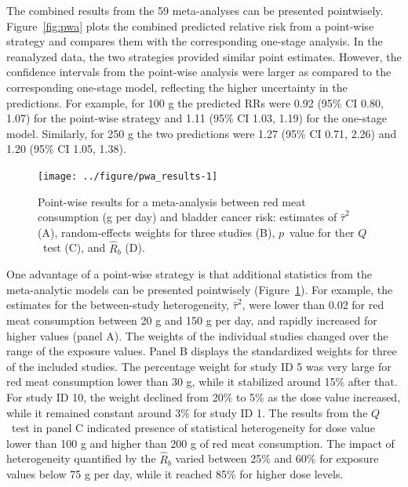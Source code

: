 \documentclass[11pt,a4paper,twoside,openany]{book}\usepackage{knitr}
\begin{document}
{{\begin{knitrout}
\end{knitrout}

\noindent The combined results from the 59 meta-analyses can be presented pointwisely. Figure~\ref{fig:pwa} plots the combined predicted relative risk from a point-wise strategy and compares them with the corresponding one-stage analysis. In the reanalyzed data, the two strategies provided similar point estimates. However, the confidence intervals from the point-wise analysis were larger as compared to the corresponding one-stage model, reflecting the higher uncertainty in the predictions. For example, for 100 g the predicted RRs were 0.92 (95\% CI 0.80, 1.07) for the point-wise strategy and 1.11 (95\% CI 1.03, 1.19) for the one-stage model. Similarly, for 250 g the two predictions were 1.27 (95\% CI 0.71, 2.26) and 1.20 (95\% CI 1.05, 1.38).

\begin{knitrout}\footnotesize
{}\color{fgcolor}\begin{figure}[ht!]

{\centering \texttt{[image: ../figure/pwa\_results-1]} 

}

\caption[Point-wise results for a meta-analysis between red meat consumption (g per day) and bladder cancer risk]{Point-wise results for a meta-analysis between red meat consumption (g per day) and bladder cancer risk: estimates of $\hat \tau^2$ (A), random-effects weights for three studies (B), $p$~value for ther $Q$~test (C), and $\hat R_b$ (D).}\label{fig:pwa_results}
\end{figure}


\end{knitrout}

One advantage of a point-wise strategy is that additional statistics from the meta-analytic models can be presented pointwisely (Figure~\ref{fig:pwa_results}). For example, the estimates for the between-study heterogeneity, $\hat \tau^2$, were lower than 0.02 for red meat consumption between 20 g and 150 g per day, and rapidly increased for higher values (panel A). The weights of the individual studies changed over the range of the exposure values. Panel B displays the standardized weights for three of the included studies. The percentage weight for study ID 5 was very large for red meat consumption lower than 30 g, while it stabilized around 15\% after that. For study ID 10, the weight declined from 20\% to 5\% as the dose value increased, while it remained constant around 3\% for study ID 1. The results from the $Q$~test in panel C indicated presence of statistical heterogeneity for dose value lower than 100 g and higher than 200 g of red meat consumption. The impact of heterogeneity quantified by the $\hat R_b$ varied between 25\% and 60\% for exposure values below 75 g per day, while it reached 85\% for higher dose levels.





}}
\end{document}
